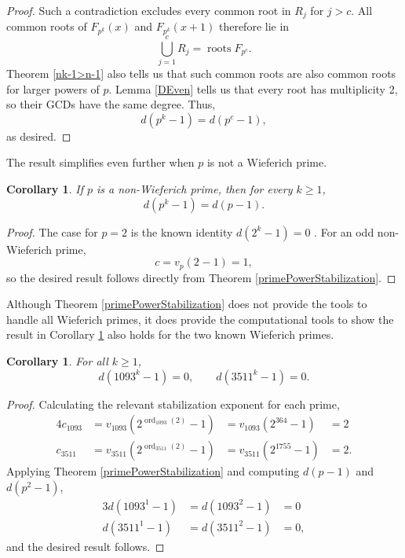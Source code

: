 \documentclass[a4paper]{article}
\newtheorem{corollary}[theorem]{Corollary}
\newcommand{\ord}[2][]{\operatorname{ord}_{#1}\!\left( #2 \right)}
\begin{document}
\begin{proof}
		Such a contradiction excludes every common root in $R_j$ for $j > c$.
		All common roots of $F_{p^k}(x)$ and $F_{p^k}(x+1)$ therefore lie in
		\begin{equation*}
			\bigcup_{j=1}^{c}{R_j} = \operatorname{roots}{F_{p^c}}.
		\end{equation*}
		Theorem \ref{nk-1>n-1} also tells us that such common roots are also common roots for larger powers of $p$.
		Lemma \ref{DEven} tells us that every root has multiplicity 2, so their GCDs have the same degree.
		Thus,
		\begin{equation*}
			d(p^k - 1) = d(p^c - 1),
		\end{equation*}
		as desired.
	\end{proof}

	The result simplifies even further when $p$ is not a Wieferich prime.
	\begin{corollary}\label{pk-1Equalsp-1}
		If $p$ is a non-Wieferich prime, then for every $k \geq 1$,
		\begin{equation*}
			d(p^k - 1) = d(p-1).
		\end{equation*}
	\end{corollary}
	\begin{proof}
		The case for $p=2$ is the known identity $d(2^k - 1) = 0$ \cite{Sutner1989}.
		For an odd non-Wieferich prime,
		\begin{equation*}
			c = v_p\left(2^{}-1\right) = 1,
		\end{equation*}
		so the desired result follows directly from Theorem \ref{primePowerStabilization}.
	\end{proof}

	Although Theorem \ref{primePowerStabilization} does not provide the tools to handle all Wieferich primes, it does provide the computational tools to show the result in Corollary \ref{pk-1Equalsp-1} also holds for the two known Wieferich primes.
	\begin{corollary}\label{pk-1Equalsp-1Wieferich}
		For all $k \geq 1$,
		\begin{equation*}
			d(1093^k - 1) = 0, \qquad d(3511^k - 1) = 0.
		\end{equation*}
	\end{corollary}
	\begin{proof}
		Calculating the relevant stabilization exponent for each prime,
		\begin{alignat*}{4}
			c_{1093} &= v_{1093}\left(2^{\ord[1093]{2}} - 1\right) &= v_{1093}\left(2^{364} - 1\right) &= 2 \\
			c_{3511} &= v_{3511}\left(2^{\ord[3511]{2}} - 1\right) &= v_{3511}\left(2^{1755} - 1\right) &= 2.
		\end{alignat*}
		Applying Theorem \ref{primePowerStabilization} and computing $d(p-1)$ and $d(p^2 - 1)$,
		\begin{alignat*}{3}
			d(1093^1 - 1) &= d(1093^2 - 1) &= 0 \\
			d(3511^1 - 1) &= d(3511^2 - 1) &= 0,
		\end{alignat*}
		and the desired result follows.
	\end{proof}
\end{document}
